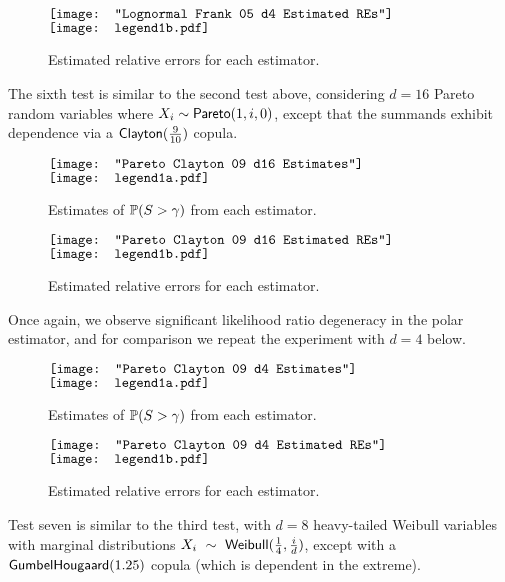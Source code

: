 \begin{figure}[H]
	\centering
	$\vcenter{\hbox{\texttt{[image: "Lognormal Frank 05 d4 Estimated REs"]}}}$
 	\hspace*{.1in}
 	$\vcenter{\hbox{\texttt{[image: legend1b.pdf]}}}$
	\caption{Estimated relative errors for each estimator.}
\end{figure}

The sixth test is similar to the second test above, considering $d=16$ Pareto random variables where $X_i \sim \mathsf{Pareto}(1, i, 0)$, except that the summands exhibit dependence via a  $\mathsf{Clayton}(\frac{9}{10})$ copula.

\begin{figure}[H]
	\centering
	$\vcenter{\hbox{\texttt{[image: "Pareto Clayton 09 d16 Estimates"]}}}$
 	\hspace*{.1in}
 	$\vcenter{\hbox{\texttt{[image: legend1a.pdf]}}}$
	\caption{Estimates of $\operatorname{{\mathbb P}}(S > \gamma)$ from each estimator.}
\end{figure}

\begin{figure}[H]
	\centering
	$\vcenter{\hbox{\texttt{[image: "Pareto Clayton 09 d16 Estimated REs"]}}}$
 	\hspace*{.1in}
 	$\vcenter{\hbox{\texttt{[image: legend1b.pdf]}}}$
	\caption{Estimated relative errors for each estimator.}
\end{figure}

Once again, we observe significant likelihood ratio degeneracy in the polar estimator, and for comparison we repeat the experiment with $d=4$ below.

\begin{figure}[H]
	\centering
	$\vcenter{\hbox{\texttt{[image: "Pareto Clayton 09 d4 Estimates"]}}}$
 	\hspace*{.1in}
 	$\vcenter{\hbox{\texttt{[image: legend1a.pdf]}}}$
	\caption{Estimates of $\operatorname{{\mathbb P}}(S > \gamma)$ from each estimator.}
\end{figure}

\begin{figure}[H]
	\centering
	$\vcenter{\hbox{\texttt{[image: "Pareto Clayton 09 d4 Estimated REs"]}}}$
 	\hspace*{.1in}
 	$\vcenter{\hbox{\texttt{[image: legend1b.pdf]}}}$
	\caption{Estimated relative errors for each estimator.}
\end{figure}

Test seven is similar to the third test, with $d=8$ heavy-tailed Weibull variables with marginal distributions $X_i~\sim~\mathsf{Weibull}(\frac{1}{4}, \frac{i}{d})$, except with a $\mathsf{GumbelHougaard}(1.25)$ copula (which is dependent in the extreme).


